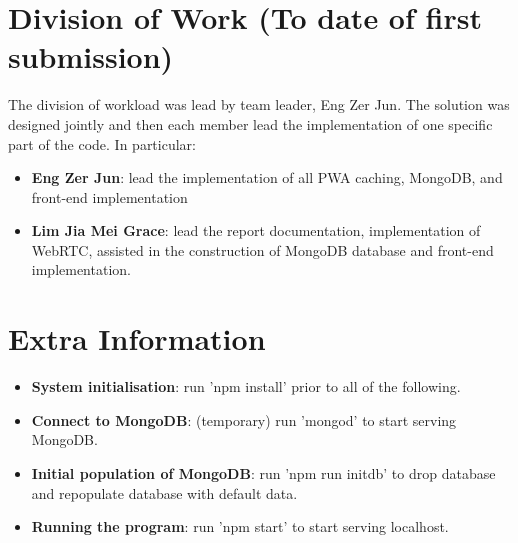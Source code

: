 \documentclass[11pt, a4paper]{article}
\begin{document}
\section{Division of Work (To date of first submission)}
The division of workload was lead by team leader, Eng Zer Jun. The solution was designed jointly 
and then each member lead the implementation of one specific part of the code. 
In particular:
\begin{itemize}
  \item \textbf{Eng Zer Jun}: lead the implementation of all PWA caching, MongoDB, and 
  front-end implementation
  \item \textbf{Lim Jia Mei Grace}: lead the report documentation, implementation of WebRTC, assisted 
  in the construction of MongoDB database and front-end implementation.
\end{itemize}

\section{Extra Information}
\begin{itemize}
  \item \textbf{System initialisation}: run 'npm install' prior to all of the following.
  \item \textbf{Connect to MongoDB}: (temporary) run 'mongod' to start serving MongoDB.
  \item \textbf{Initial population of MongoDB}: run 'npm run initdb' to drop database and
  repopulate database with default data.
  \item \textbf{Running the program}: run 'npm start' to start serving localhost.
\end{itemize}

\printbibliography
\end{document}
